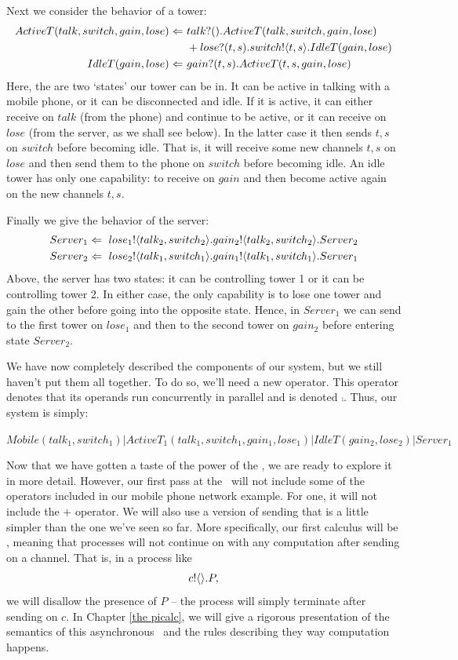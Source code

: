 	Next we consider the behavior of a tower:
	\begin{align*}
		ActiveT(talk,switch,gain,lose) \Leftarrow\  & {talk}?({}).ActiveT(talk,switch,gain,lose) \\  
		 & +{lose}?({t,s}).{switch}!\langle{t,s}\rangle.IdleT(gain, lose)\\
		IdleT(gain,lose) \Leftarrow\  & {gain}?({t,s}).ActiveT(t,s,gain,lose)\\
	\end{align*}
Here, the are two `states' our tower can be in.  It can be active in talking with a mobile phone, or it can be disconnected and idle.  If it is active, it can either receive on $talk$ (from the phone) and continue to be active, or it can receive on $lose$ (from the server, as we shall see below).  In the latter case it then sends $t,s$ on $switch$ before becoming idle.  That is, it will receive some new channels $t,s$ on $lose$ and then send them to the phone on $switch$ before becoming idle.  An idle tower has only one capability: to receive on $gain$ and then become active again on the new channels $t,s$.

Finally we give the behavior of the server:
\begin{align*}
	Server_1 \Leftarrow\  {lose_1}!\langle{talk_2,switch_2}\rangle. {gain_2}!\langle{talk_2,switch_2}\rangle. Server_2\\
	Server_2 \Leftarrow\  {lose_2}!\langle{talk_1,switch_1}\rangle. {gain_1}!\langle{talk_1,switch_1}\rangle. Server_1
\end{align*}
Above, the server has two states: it can be controlling tower 1 or it can be controlling tower 2.  In either case, the only capability is to lose one tower and gain the other before going into the opposite state.  Hence, in $Server_1$ we can send to the first tower on $lose_1$ and then to the second tower on $gain_2$ before entering state $Server_2$.

We have now completely described the components of our system, but we still haven't put them all together.  To do so, we'll need a new operator.  This operator denotes that its operands run concurrently in parallel and is denoted $\comp$.  Thus, our system is simply:
\begin{center}
	\small{$\textstyle Mobile(talk_1,switch_1)|ActiveT_1(talk_1,switch_1,gain_1,lose_1)|IdleT(gain_2,lose_2)|Server_1$}
\end{center}

	Now that we have gotten a taste of the power of the \picalc, we are ready to explore it in more detail.  However, our first pass at the \picalc\ will not include some of the operators included in our mobile phone network example.  For one, it will not include the $+$ operator.  We will also use a version of sending that is a little simpler than the one we've seen so far.  More specifically, our first calculus will be , meaning that processes will not continue on with any computation after sending on a channel.  That is, in a process like
\[
	{c}!\langle{}\rangle.P,
\]
we will disallow the presence of $P$ -- the process will simply terminate after sending on $c$.  In Chapter \ref{the picalc}, we will give a rigorous presentation of the semantics of this asynchronous \picalc\ and the rules describing they way computation happens.

